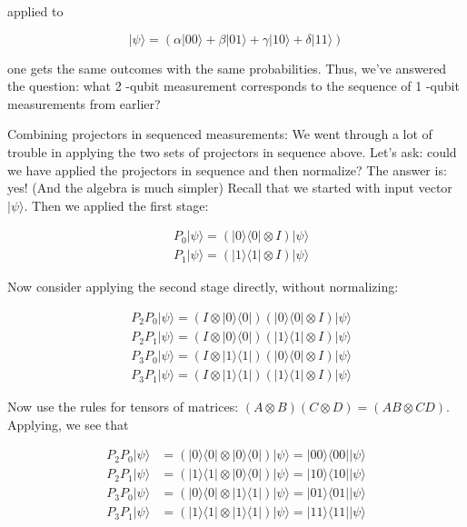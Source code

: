 \documentclass[main.tex]{subfiles}
\begin{document}
    applied to
    
    $$
    |\psi\rangle=(\alpha|00\rangle+\beta|01\rangle+\gamma|10\rangle+\delta|11\rangle)
    $$
    
    one gets the same outcomes with the same probabilities. Thus, we've answered the question: what 2 -qubit measurement corresponds to the sequence of 1 -qubit measurements from earlier?
    
    Combining projectors in sequenced measurements: We went through a lot of trouble in applying the two sets of projectors in sequence above. Let's ask: could we have applied the projectors in sequence and then normalize? The answer is: yes! (And the algebra is much simpler) Recall that we started with input vector $|\psi\rangle$. Then we applied the first stage:
    
    $$
    \begin{aligned}
    &P_{0}|\psi\rangle=(|0\rangle\langle 0| \otimes I)|\psi\rangle \\
    &P_{1}|\psi\rangle=(|1\rangle\langle 1| \otimes I)|\psi\rangle
    \end{aligned}
    $$
    
    Now consider applying the second stage directly, without normalizing:
    
    $$
    \begin{aligned}
    &P_{2} P_{0}|\psi\rangle=(I \otimes|0\rangle\langle 0|)(|0\rangle\langle 0| \otimes I)|\psi\rangle \\
    &P_{2} P_{1}|\psi\rangle=(I \otimes|0\rangle\langle 0|)(|1\rangle\langle 1| \otimes I)|\psi\rangle \\
    &P_{3} P_{0}|\psi\rangle=(I \otimes|1\rangle\langle 1|)(|0\rangle\langle 0| \otimes I)|\psi\rangle \\
    &P_{3} P_{1}|\psi\rangle=(I \otimes|1\rangle\langle 1|)(|1\rangle\langle 1| \otimes I)|\psi\rangle
    \end{aligned}
    $$
    
    Now use the rules for tensors of matrices: $(A \otimes B)(C \otimes D)=(A B \otimes C D)$. Applying, we see that
    
    $$
    \begin{aligned}
    P_{2} P_{0}|\psi\rangle &=(|0\rangle\langle 0|\otimes| 0\rangle\langle 0|)|\psi\rangle=|00\rangle\langle 00|| \psi\rangle \\
    P_{2} P_{1}|\psi\rangle &=(|1\rangle\langle 1|\otimes| 0\rangle\langle 0|)|\psi\rangle=|10\rangle\langle 10|| \psi\rangle \\
    P_{3} P_{0}|\psi\rangle &=(|0\rangle\langle 0|\otimes| 1\rangle\langle 1|)|\psi\rangle=|01\rangle\langle 01|| \psi\rangle \\
    P_{3} P_{1}|\psi\rangle &=(|1\rangle\langle 1|\otimes| 1\rangle\langle 1|)|\psi\rangle=|11\rangle\langle 11|| \psi\rangle
    \end{aligned}
    $$
    
\end{document}
